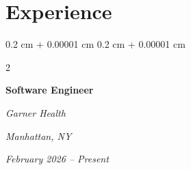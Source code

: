 \documentclass[10pt, letterpaper]{article}
\newenvironment{highlights}{
    \begin{itemize}[
        topsep=0.10 cm,
        parsep=0.10 cm,
        partopsep=0pt,
        itemsep=0pt,
        leftmargin=0.4 cm + 10pt
    ]
}{
    \end{itemize}
} %
\newenvironment{onecolentry}{
    \begin{adjustwidth}{
        0.2 cm + 0.00001 cm
    }{
        0.2 cm + 0.00001 cm
    }
}{
    \end{adjustwidth}
} %
\newenvironment{twocolentry}[2][]{
    \onecolentry
    \def\secondColumn{#2}
    \setcolumnwidth{\fill, 4.5 cm}
    \begin{paracol}{2}
}{
    \switchcolumn \raggedleft \secondColumn
    \end{paracol}
    \endonecolentry
} %
\begin{document}
        
        



        

            




    
    \section{Experience}

        \begin{twocolentry}{
        \textit{Manhattan, NY}

        \textit{February 2026 – Present}}
            \textbf{Software Engineer}

            \textit{Garner Health}
        \end{twocolentry}
\end{document}
